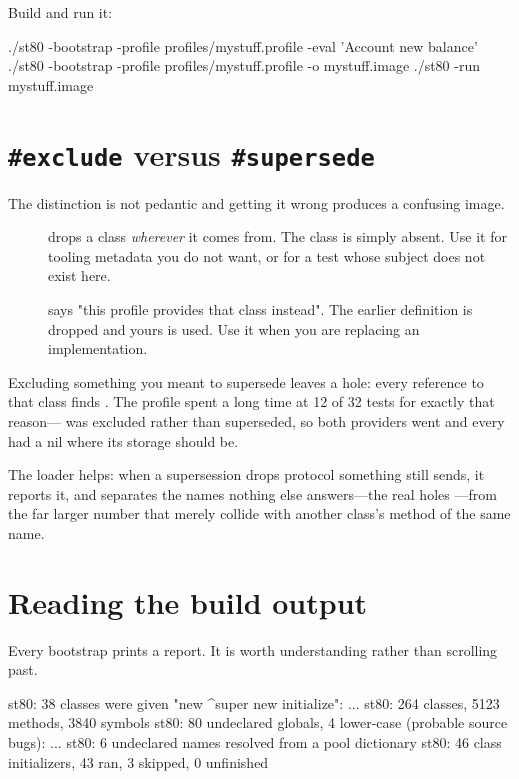 Build and run it:

\begin{sh}
./st80 -bootstrap -profile profiles/mystuff.profile -eval 'Account new balance'
./st80 -bootstrap -profile profiles/mystuff.profile -o mystuff.image
./st80 -run mystuff.image
\end{sh}

\section{\texttt{\#exclude} versus \texttt{\#supersede}}

The distinction is not pedantic and getting it wrong produces a confusing
image.

\begin{description}
\item[] drops a class \emph{wherever} it comes from. The class
  is simply absent. Use it for tooling metadata you do not want, or for a test
  whose subject does not exist here.
\item[] says "this profile provides that class instead". The
  earlier definition is dropped and yours is used. Use it when you are
  replacing an implementation.
\end{description}

Excluding something you meant to supersede leaves a hole: every reference to
that class finds . The  profile spent a long time at
12 of 32 tests for exactly that reason--- was excluded rather
than superseded, so both providers went and every  had a nil where
its storage should be.

The loader helps: when a supersession drops protocol something still sends, it
reports it, and separates the names nothing else answers---the real holes
---from the far larger number that merely collide with another class's method
of the same name.

\section{Reading the build output}

Every bootstrap prints a report. It is worth understanding rather than
scrolling past.

\begin{plain}
st80: 38 classes were given "new ^super new initialize": ...
st80: 264 classes, 5123 methods, 3840 symbols
st80: 80 undeclared globals, 4 lower-case (probable source bugs): ...
st80: 6 undeclared names resolved from a pool dictionary
st80: 46 class initializers, 43 ran, 3 skipped, 0 unfinished
\end{plain}

